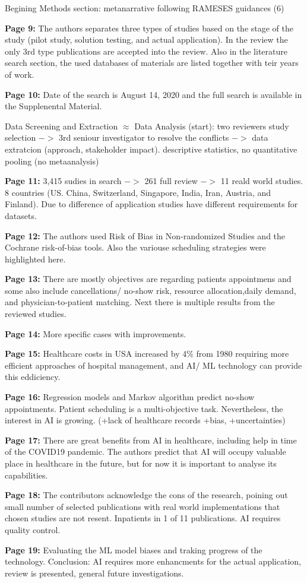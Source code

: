     Begining Methods section: metanarrative following RAMESES guidances (6)
    
    \textbf{Page 9:}
    The authors separates three types of studies based on the stage of the study (pilot study, solution testing, and actual application). In the review the only 3rd type publications are accepted into the review. Also in the literature search section, the used databases of materials are listed together with teir years of work.
    
    \textbf{Page 10:}
    Date of the search is August 14, 2020 and the full search is available in the Supplenental Material.
    
    Data Screening and Extraction $\approx$ Data Analysis (start): two reviewers study selection $->$ 3rd seniour investigator to resolve the conflicts $->$ data extratcion (approach, stakeholder impact). descriptive statistics, no quantitative pooling (no metaanalysis)
    
    \textbf{Page 11:}
    3,415 sudies in search $->$ 261 full review $->$ 11 reald world studies. 8 countries (US. China, Switzerland, Singapore, India, Iran, Austria, and Finland). Due to difference of application studies have different requirements for datasets.

    \textbf{Page 12:}
    The authors used Risk of Bias in Non-randomized Studies and the Cochrane risk-of-bias tools. Also the variouse scheduling strategies were highlighted here.

    \textbf{Page 13:}
    There are mostly objectives are regarding patients appointmens and some also include cancellations/ no-show risk, resource allocation,daily demand, and physician-to-patient matching. Next there is multiple results from the reviewed studies.

    \textbf{Page 14:}
    More specific cases with improvements.

    \textbf{Page 15:}
    Healthcare costs in USA increased by 4\% from 1980 requiring more efficient approaches of hospital management, and AI/ ML technology can provide this eddiciency.

    \textbf{Page 16:}
    Regression models and Markov algorithm predict no-show appointments. Patient scheduling is a multi-objective task. Nevertheless, the interest in AI is growing. (+lack of healthcare records +bias, +uncertainties)
    
    \textbf{Page 17:}
    There are great benefits from AI in healthcare, including help in time of the COVID19 pandemic. The authors predict that AI will occupy valuable place in healthcare in the future, but for now it is important to analyse its capabilities.
    
    \textbf{Page 18:}
    The contributors acknowledge the cons of the research, poining out small number of selected publications with real world implementations that chosen studies are not resent. Inpatients in 1 of 11 publications. AI requires quality control.
    
    \textbf{Page 19:}
    Evaluating the ML model biases and traking progress of the technology. 
    Conclusion: AI requires more enhancments for the actual application, review is presented, general future investigations. 

    